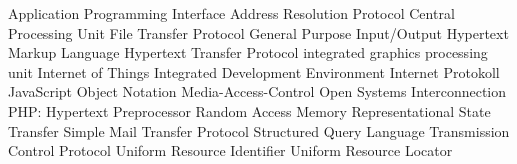 \begin{acronym}[Bash]
  {Application Programming Interface}
  {Address Resolution Protocol}
  {Central Processing Unit}
  {File Transfer Protocol}
  {General Purpose Input/Output}
  {Hypertext Markup Language}
  {Hypertext Transfer Protocol}
  {integrated graphics processing unit}
  {Internet of Things}
  {Integrated Development Environment}
  {Internet Protokoll}
  {JavaScript Object Notation}
  {Media-Access-Control}
  {Open Systems Interconnection}
  {PHP: Hypertext Preprocessor}
  {Random Access Memory}
  {Representational State Transfer}
  {Simple Mail Transfer Protocol}
  {Structured Query Language}
  {Transmission Control Protocol}
  {Uniform Resource Identifier}
  {Uniform Resource Locator}
\end{acronym}
